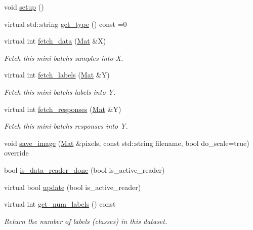 \begin{DoxyCompactItemize}
\item 
void \hyperlink{classlbann_1_1generic__data__reader_a879bb7dcb57a0aa1ef9c5039f5b0efda}{setup} ()
\item 
virtual std\+::string \hyperlink{classlbann_1_1generic__data__reader_abeb849fb8e10b4fa317c90bc33f61758}{get\+\_\+type} () const =0
\item 
virtual int \hyperlink{classlbann_1_1generic__data__reader_a46b658ba4f6b746632b683568ab76f77}{fetch\+\_\+data} (\hyperlink{base_8hpp_a68f11fdc31b62516cb310831bbe54d73}{Mat} \&X)
\begin{DoxyCompactList}\small\item\em Fetch this mini-\/batch\textquotesingle{}s samples into X. \end{DoxyCompactList}\item 
virtual int \hyperlink{classlbann_1_1generic__data__reader_a7e624f92e38b0ee4224a6afaaf2acbdb}{fetch\+\_\+labels} (\hyperlink{base_8hpp_a68f11fdc31b62516cb310831bbe54d73}{Mat} \&Y)
\begin{DoxyCompactList}\small\item\em Fetch this mini-\/batch\textquotesingle{}s labels into Y. \end{DoxyCompactList}\item 
virtual int \hyperlink{classlbann_1_1generic__data__reader_aeaa97d3683add33d1c6d69a769dd6a20}{fetch\+\_\+responses} (\hyperlink{base_8hpp_a68f11fdc31b62516cb310831bbe54d73}{Mat} \&Y)
\begin{DoxyCompactList}\small\item\em Fetch this mini-\/batch\textquotesingle{}s responses into Y. \end{DoxyCompactList}\item 
void \hyperlink{classlbann_1_1generic__data__reader_a8cf298061c73f55e2fe717acd2a9f178}{save\+\_\+image} (\hyperlink{base_8hpp_a68f11fdc31b62516cb310831bbe54d73}{Mat} \&pixels, const std\+::string filename, bool do\+\_\+scale=true) override
\item 
bool \hyperlink{classlbann_1_1generic__data__reader_a8640edf9c71e3b7bee8a8e947c4690fa}{is\+\_\+data\+\_\+reader\+\_\+done} (bool is\+\_\+active\+\_\+reader)
\item 
virtual bool \hyperlink{classlbann_1_1generic__data__reader_a1d10dec5713fbe60e61b4dc400227ade}{update} (bool is\+\_\+active\+\_\+reader)
\item 
virtual int \hyperlink{classlbann_1_1generic__data__reader_a935ce6262d75f1834e550c3bc16a6547}{get\+\_\+num\+\_\+labels} () const
\begin{DoxyCompactList}\small\item\em Return the number of labels (classes) in this dataset. \end{DoxyCompactList}\item 

\end{DoxyCompactItemize}
